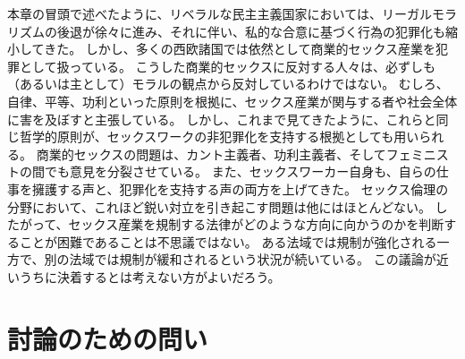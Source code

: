 \documentclass[paper=a4,book,openany]{jlreq}
\begin{document}
本章の冒頭で述べたように、リベラルな民主主義国家においては、リーガルモラリズムの後退が徐々に進み、それに伴い、私的な合意に基づく行為の犯罪化も縮小してきた。
しかし、多くの西欧諸国では依然として商業的セックス産業を犯罪として扱っている。
こうした商業的セックスに反対する人々は、必ずしも（あるいは主として）モラルの観点から反対しているわけではない。
むしろ、自律、平等、功利といった原則を根拠に、セックス産業が関与する者や社会全体に害を及ぼすと主張している。
しかし、これまで見てきたように、これらと同じ哲学的原則が、セックスワークの非犯罪化を支持する根拠としても用いられる。
商業的セックスの問題は、カント主義者、功利主義者、そしてフェミニストの間でも意見を分裂させている。
また、セックスワーカー自身も、自らの仕事を擁護する声と、犯罪化を支持する声の両方を上げてきた。
セックス倫理の分野において、これほど鋭い対立を引き起こす問題は他にはほとんどない。
したがって、セックス産業を規制する法律がどのような方向に向かうのかを判断することが困難であることは不思議ではない。
ある法域では規制が強化される一方で、別の法域では規制が緩和されるという状況が続いている。
この議論が近いうちに決着するとは考えない方がよいだろう。

\section{討論のための問い}
\end{document}
